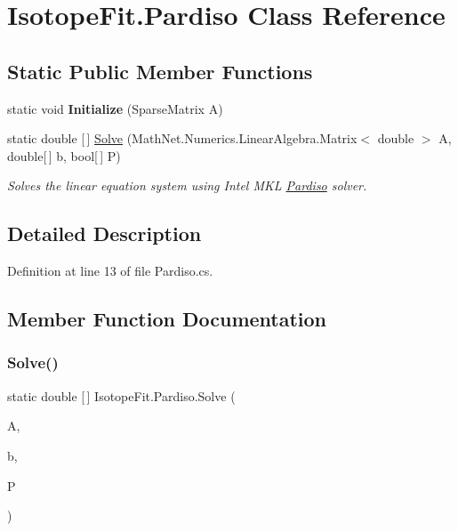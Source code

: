 \hypertarget{class_isotope_fit_1_1_pardiso}{}\section{Isotope\+Fit.\+Pardiso Class Reference}
\label{class_isotope_fit_1_1_pardiso}
\subsection*{Static Public Member Functions}
\begin{DoxyCompactItemize}
\item 
\mbox{\label{class_isotope_fit_1_1_pardiso_aee93b0dd1d88f091eab140f424be6702}} 
static void {\bfseries Initialize} (Sparse\+Matrix A)
\item 
static double \mbox{[}$\,$\mbox{]} \mbox{\hyperlink{class_isotope_fit_1_1_pardiso_af6dfb5879bc9ff922a9af4a0341e4c52}{Solve}} (Math\+Net.\+Numerics.\+Linear\+Algebra.\+Matrix$<$ double $>$ A, double\mbox{[}$\,$\mbox{]} b, bool\mbox{[}$\,$\mbox{]} P)
\begin{DoxyCompactList}\small\item\em Solves the linear equation system using Intel M\+KL \mbox{\hyperlink{class_isotope_fit_1_1_pardiso}{Pardiso}} solver. \end{DoxyCompactList}\end{DoxyCompactItemize}


\subsection{Detailed Description}


Definition at line 13 of file Pardiso.\+cs.



\subsection{Member Function Documentation}
\mbox{\label{class_isotope_fit_1_1_pardiso_af6dfb5879bc9ff922a9af4a0341e4c52}} 
\subsubsection{\texorpdfstring{Solve()}{Solve()}}
{\footnotesize\ttfamily static double \mbox{[}$\,$\mbox{]} Isotope\+Fit.\+Pardiso.\+Solve (\begin{DoxyParamCaption}\item[{Math\+Net.\+Numerics.\+Linear\+Algebra.\+Matrix$<$ double $>$}]{A,  }\item[{double \mbox{[}$\,$\mbox{]}}]{b,  }\item[{bool \mbox{[}$\,$\mbox{]}}]{P }\end{DoxyParamCaption})\hspace{0.3cm}{\ttfamily [static]}}



